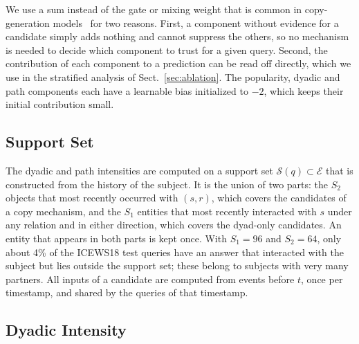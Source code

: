 \documentclass[runningheads]{llncs}
\begin{document}
We use a sum instead of the gate or mixing weight that is common in copy-generation models~\cite{zhu2021cygnet} for two reasons. First, a component without evidence for a candidate simply adds nothing and cannot suppress the others, so no mechanism is needed to decide which component to trust for a given query. Second, the contribution of each component to a prediction can be read off directly, which we use in the stratified analysis of Sect.~\ref{sec:ablation}. The popularity, dyadic and path components each have a learnable bias initialized to $-2$, which keeps their initial contribution small.

\subsection{Support Set}

The dyadic and path intensities are computed on a support set $\mathcal{S}(q) \subset \mathcal{E}$ that is constructed from the history of the subject. It is the union of two parts: the $S_2$ objects that most recently occurred with $(s, r)$, which covers the candidates of a copy mechanism, and the $S_1$ entities that most recently interacted with $s$ under any relation and in either direction, which covers the dyad-only candidates. An entity that appears in both parts is kept once. With $S_1 = 96$ and $S_2 = 64$, only about 4\% of the ICEWS18 test queries have an answer that interacted with the subject but lies outside the support set; these belong to subjects with very many partners. All inputs of a candidate are computed from events before $t$, once per timestamp, and shared by the queries of that timestamp.

\subsection{Dyadic Intensity}
\end{document}
